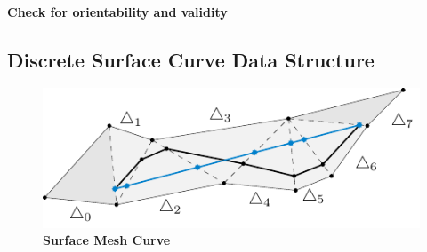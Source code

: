 \documentclass{stdlocal}
\begin{document}
  \paragraph{Check for orientability and validity}


\subsection{Discrete Surface Curve Data Structure} %
\label{sub:discrete_surface_curve_data_structure}

  \begin{figure}
    \centering
    \includegraphics[width=0.8\linewidth]{figures/surface-mesh-curve.pdf}
    \caption[Surface Mesh Curve]{%
      \textbf{Surface Mesh Curve}\\
    }
  \end{figure}
\end{document}
